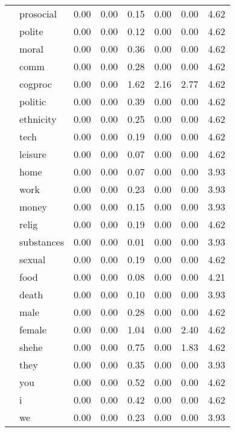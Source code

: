 \begin{table}[!h]
\begin{tabular}[t]{llrrrrrr}
\cmidrule{2-8}
 & prosocial & 0.00 & 0.00 & 0.15 & 0.00 & 0.00 & 4.62\\
\cmidrule{2-8}
 & polite & 0.00 & 0.00 & 0.12 & 0.00 & 0.00 & 4.62\\
\cmidrule{2-8}
 & moral & 0.00 & 0.00 & 0.36 & 0.00 & 0.00 & 4.62\\
\cmidrule{2-8}
 & comm & 0.00 & 0.00 & 0.28 & 0.00 & 0.00 & 4.62\\
\cmidrule{2-8}
 & cogproc & 0.00 & 0.00 & 1.62 & 2.16 & 2.77 & 4.62\\
\cmidrule{2-8}
 & politic & 0.00 & 0.00 & 0.39 & 0.00 & 0.00 & 4.62\\
\cmidrule{2-8}
 & ethnicity & 0.00 & 0.00 & 0.25 & 0.00 & 0.00 & 4.62\\
\cmidrule{2-8}
 & tech & 0.00 & 0.00 & 0.19 & 0.00 & 0.00 & 4.62\\
\cmidrule{2-8}
 & leisure & 0.00 & 0.00 & 0.07 & 0.00 & 0.00 & 4.62\\
\cmidrule{2-8}
 & home & 0.00 & 0.00 & 0.07 & 0.00 & 0.00 & 3.93\\
\cmidrule{2-8}
 & work & 0.00 & 0.00 & 0.23 & 0.00 & 0.00 & 3.93\\
\cmidrule{2-8}
 & money & 0.00 & 0.00 & 0.15 & 0.00 & 0.00 & 3.93\\
\cmidrule{2-8}
 & relig & 0.00 & 0.00 & 0.19 & 0.00 & 0.00 & 4.62\\
\cmidrule{2-8}
 & substances & 0.00 & 0.00 & 0.01 & 0.00 & 0.00 & 3.93\\
\cmidrule{2-8}
 & sexual & 0.00 & 0.00 & 0.19 & 0.00 & 0.00 & 4.62\\
\cmidrule{2-8}
 & food & 0.00 & 0.00 & 0.08 & 0.00 & 0.00 & 4.21\\
\cmidrule{2-8}
 & death & 0.00 & 0.00 & 0.10 & 0.00 & 0.00 & 3.93\\
\cmidrule{2-8}
 & male & 0.00 & 0.00 & 0.28 & 0.00 & 0.00 & 4.62\\
\cmidrule{2-8}
 & female & 0.00 & 0.00 & 1.04 & 0.00 & 2.40 & 4.62\\
\cmidrule{2-8}
 & shehe & 0.00 & 0.00 & 0.75 & 0.00 & 1.83 & 4.62\\
\cmidrule{2-8}
 & they & 0.00 & 0.00 & 0.35 & 0.00 & 0.00 & 3.93\\
\cmidrule{2-8}
 & you & 0.00 & 0.00 & 0.52 & 0.00 & 0.00 & 4.62\\
\cmidrule{2-8}
 & i & 0.00 & 0.00 & 0.42 & 0.00 & 0.00 & 4.62\\
\cmidrule{2-8}
 & we & 0.00 & 0.00 & 0.23 & 0.00 & 0.00 & 3.93\\
\cmidrule{2-8}

\end{tabular}
\end{table}
